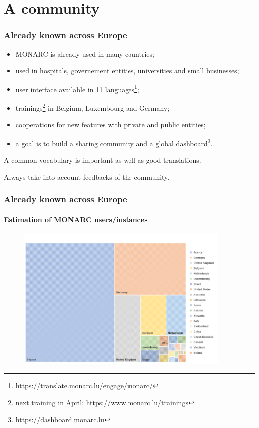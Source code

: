 \documentclass[]{beamer}
\begin{document}
\section{A community}
\begin{frame}
    \frametitle{Already known across Europe}
    \begin{center}
        \begin{itemize}
            \item MONARC is already used in many countries;
            \item used in hospitals, governement entities, universities and small businesses;
            \item user interface available in 11 languages\footnote{\url{https://translate.monarc.lu/engage/monarc/}};
            \item trainings\footnote{next training in April: \url{https://www.monarc.lu/trainings}} in Belgium, Luxembourg and Germany;
            \item cooperations for new features with private and public entities;
            \item a goal is to build a sharing community and a global dashboard\footnote{\url{https://dashboard.monarc.lu}}.
        \end{itemize}
    \end{center}
    \bigskip
    A common vocabulary is important as well as good translations.

    \bigskip
    Always take into account feedbacks of the community.
\end{frame}


\begin{frame}
    \frametitle{Already known across Europe}
    \framesubtitle{Estimation of MONARC users/instances}
    \begin{figure}
        \includegraphics[width=10.3cm]{./pictures/monarc-countries-estimation.png}
      \end{figure}
\end{frame}
\end{document}
